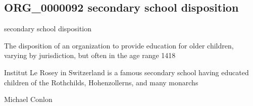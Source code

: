 \documentclass[letterpaper,10pt,english]{sphinxmanual}
\begin{document}
\subsection{ORG\_0000092 \sphinxhyphen{} secondary school disposition}
\label{\detokenize{doc-ORG_0000092:org-0000092-secondary-school-disposition}}\label{\detokenize{doc-ORG_0000092:index-0}}\label{\detokenize{doc-ORG_0000092::doc}}
\begin{sphinxShadowBox}

\sphinxAtStartPar
secondary school disposition
\end{sphinxShadowBox}

\begin{sphinxShadowBox}

\sphinxAtStartPar
{\hyperref[\detokenize{doc-BFO_0000016::doc}]{}}
\end{sphinxShadowBox}

\begin{sphinxShadowBox}

\sphinxAtStartPar
The disposition of an organization to provide education for older children, varying by jurisdiction, but often in the age range 14\sphinxhyphen{}18
\end{sphinxShadowBox}

\begin{sphinxShadowBox}

\sphinxAtStartPar
{}
\end{sphinxShadowBox}

\begin{sphinxShadowBox}

\sphinxAtStartPar
Institut Le Rosey in Switzerland is a famous secondary school having educated children of the Rothchilds, Hohenzollerns, and many monarchs
\end{sphinxShadowBox}

\begin{sphinxShadowBox}

\sphinxAtStartPar
Michael Conlon 
\end{sphinxShadowBox}
\begin{quote}

\ignorespaces \end{quote}
\end{document}
